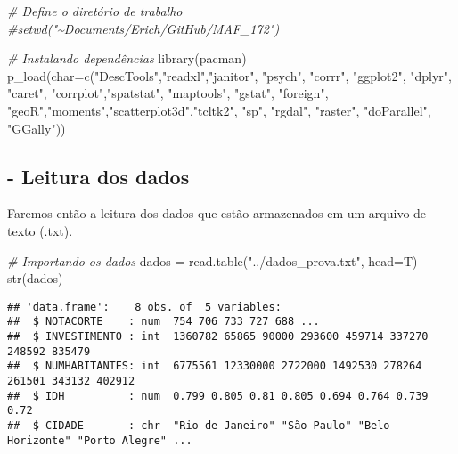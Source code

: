 \documentclass[
]{article}
\newenvironment{Shaded}{\begin{snugshade}}{\end{snugshade}}
\newcommand{\AttributeTok}[1]{\textcolor[rgb]{0.77,0.63,0.00}{#1}}
\newcommand{\CommentTok}[1]{\textcolor[rgb]{0.56,0.35,0.01}{\textit{#1}}}
\newcommand{\FunctionTok}[1]{\textcolor[rgb]{0.00,0.00,0.00}{#1}}
\newcommand{\NormalTok}[1]{#1}
\newcommand{\OtherTok}[1]{\textcolor[rgb]{0.56,0.35,0.01}{#1}}
\newcommand{\StringTok}[1]{\textcolor[rgb]{0.31,0.60,0.02}{#1}}
\begin{document}
\begin{Shaded}
\begin{Highlighting}[]
\CommentTok{\# Define o diretório de trabalho}
\CommentTok{\#setwd("\textasciitilde{}Documents/Erich/GitHub/MAF\_172") }

\CommentTok{\# Instalando dependências}
\FunctionTok{library}\NormalTok{(pacman)}
\FunctionTok{p\_load}\NormalTok{(}\AttributeTok{char=}\FunctionTok{c}\NormalTok{(}\StringTok{"DescTools"}\NormalTok{,}\StringTok{"readxl"}\NormalTok{,}\StringTok{"janitor"}\NormalTok{, }\StringTok{"psych"}\NormalTok{, }\StringTok{"corrr"}\NormalTok{, }\StringTok{"ggplot2"}\NormalTok{, }\StringTok{"dplyr"}\NormalTok{, }\StringTok{"caret"}\NormalTok{, }\StringTok{"corrplot"}\NormalTok{,}\StringTok{"spatstat"}\NormalTok{, }\StringTok{"maptools"}\NormalTok{, }\StringTok{"gstat"}\NormalTok{, }\StringTok{"foreign"}\NormalTok{, }\StringTok{"geoR"}\NormalTok{,}\StringTok{"moments"}\NormalTok{,}\StringTok{"scatterplot3d"}\NormalTok{,}\StringTok{"tcltk2"}\NormalTok{, }\StringTok{"sp"}\NormalTok{, }\StringTok{"rgdal"}\NormalTok{, }\StringTok{"raster"}\NormalTok{, }\StringTok{"doParallel"}\NormalTok{, }\StringTok{"GGally"}\NormalTok{))}
\end{Highlighting}
\end{Shaded}

\hypertarget{leitura-dos-dados}{%
\subsection{- Leitura dos dados}\label{leitura-dos-dados}}

Faremos então a leitura dos dados que estão armazenados em um arquivo de
texto (.txt).

\begin{Shaded}
\begin{Highlighting}[]
\CommentTok{\# Importando os dados}
\NormalTok{dados }\OtherTok{=} \FunctionTok{read.table}\NormalTok{(}\StringTok{"../dados\_prova.txt"}\NormalTok{, }\AttributeTok{head=}\NormalTok{T)}
\FunctionTok{str}\NormalTok{(dados)}
\end{Highlighting}
\end{Shaded}

\begin{verbatim}
## 'data.frame':    8 obs. of  5 variables:
##  $ NOTACORTE    : num  754 706 733 727 688 ...
##  $ INVESTIMENTO : int  1360782 65865 90000 293600 459714 337270 248592 835479
##  $ NUMHABITANTES: int  6775561 12330000 2722000 1492530 278264 261501 343132 402912
##  $ IDH          : num  0.799 0.805 0.81 0.805 0.694 0.764 0.739 0.72
##  $ CIDADE       : chr  "Rio de Janeiro" "São Paulo" "Belo Horizonte" "Porto Alegre" ...
\end{verbatim}
\end{document}
